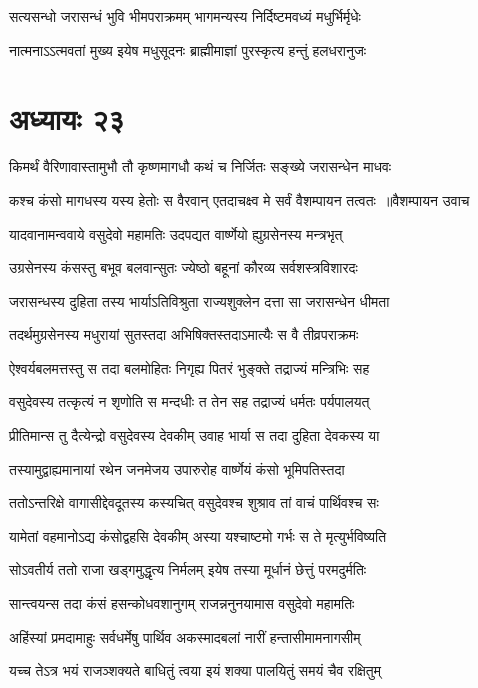 \twolineshloka
{सत्यसन्धो जरासन्धं भुवि भीमपराक्रमम्}
{भागमन्यस्य निर्दिष्टमवध्यं मधुर्भिर्मृधेः}


\twolineshloka
{नात्मनाऽऽत्मवतां मुख्य इयेष मधुसूदनः}
{ब्राह्मीमाज्ञां पुरस्कृत्य हन्तुं हलधरानुजः}


\chapter{अध्यायः २३}
\twolineshloka
{किमर्थं वैरिणावास्तामुभौ तौ कृष्णमागधौ}
{कथं च निर्जितः सङ्ख्ये जरासन्धेन माधवः}


\twolineshloka
{कश्च कंसो मागधस्य यस्य हेतोः स वैरवान्}
{एतदाचक्ष्व मे सर्वं वैशम्पायन तत्वतः ॥वैशम्पायन उवाच}


\twolineshloka
{यादवानामन्ववाये वसुदेवो महामतिः}
{उदपद्यत वार्ष्णेयो ह्युग्रसेनस्य मन्त्रभृत्}


\twolineshloka
{उग्रसेनस्य कंसस्तु बभूव बलवान्सुतः}
{ज्येष्ठो बहूनां कौरव्य सर्वशस्त्रविशारदः}


\twolineshloka
{जरासन्धस्य दुहिता तस्य भार्याऽतिविश्रुता}
{राज्यशुक्लेन दत्ता सा जरासन्धेन धीमता}


\twolineshloka
{तदर्थमुग्रसेनस्य मधुरायां सुतस्तदा}
{अभिषिक्तस्तदाऽमात्यैः स वै तीव्रपराक्रमः}


\twolineshloka
{ऐश्वर्यबलमत्तस्तु स तदा बलमोहितः}
{निगृह्य पितरं भुङ्क्ते तद्राज्यं मन्त्रिभिः सह}


\twolineshloka
{वसुदेवस्य तत्कृत्यं न शृणोति स मन्दधीः}
{त तेन सह तद्राज्यं धर्मतः पर्यपालयत्}


\twolineshloka
{प्रीतिमान्स तु दैत्येन्द्रो वसुदेवस्य देवकीम्}
{उवाह भार्या स तदा दुहिता देवकस्य या}


\twolineshloka
{तस्यामुद्वाह्यमानायां रथेन जनमेजय}
{उपारुरोह वार्ष्णेयं कंसो भूमिपतिस्तदा}


\twolineshloka
{ततोऽन्तरिक्षे वागासीद्देवदूतस्य कस्यचित्}
{वसुदेवश्च शुश्राव तां वाचं पार्थिवश्च सः}


\twolineshloka
{यामेतां वहमानोऽद्य कंसोद्वहसि देवकीम्}
{अस्या यश्चाष्टमो गर्भः स ते मृत्युर्भविष्यति}


\twolineshloka
{सोऽवतीर्य ततो राजा खड्गमुद्धृत्य निर्मलम्}
{इयेष तस्या मूर्धानं छेत्तुं परमदुर्मतिः}


\twolineshloka
{सान्त्वयन्स तदा कंसं हसन्कोधवशानुगम्}
{राजन्ननुनयामास वसुदेवो महामतिः}


\twolineshloka
{अहिंस्यां प्रमदामाहुः सर्वधर्मेषु पार्थिव}
{अकस्मादबलां नारीं हन्तासीमामनागसीम्}


\twolineshloka
{यच्च तेऽत्र भयं राजञ्शक्यते बाधितुं त्वया}
{इयं शक्या पालयितुं समयं चैव रक्षितुम्}


